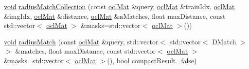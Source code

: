 \begin{DoxyCompactItemize}
\item 
\hyperlink{legacy_8hpp_a8bb47f092d473522721002c86c13b94e}{void} \hyperlink{classcv_1_1ocl_1_1BruteForceMatcher__OCL__base_a7f469948ba5afa5b039d8c1998e02ea4}{radius\-Match\-Collection} (const \hyperlink{classcv_1_1ocl_1_1oclMat}{ocl\-Mat} \&query, \hyperlink{classcv_1_1ocl_1_1oclMat}{ocl\-Mat} \&train\-Idx, \hyperlink{classcv_1_1ocl_1_1oclMat}{ocl\-Mat} \&img\-Idx, \hyperlink{classcv_1_1ocl_1_1oclMat}{ocl\-Mat} \&distance, \hyperlink{classcv_1_1ocl_1_1oclMat}{ocl\-Mat} \&n\-Matches, float max\-Distance, const std\-::vector$<$ \hyperlink{classcv_1_1ocl_1_1oclMat}{ocl\-Mat} $>$ \&masks=std\-::vector$<$ \hyperlink{classcv_1_1ocl_1_1oclMat}{ocl\-Mat} $>$())
\item 
\hyperlink{legacy_8hpp_a8bb47f092d473522721002c86c13b94e}{void} \hyperlink{classcv_1_1ocl_1_1BruteForceMatcher__OCL__base_aba5ff7d6c54310d241452f4cc96af40a}{radius\-Match} (const \hyperlink{classcv_1_1ocl_1_1oclMat}{ocl\-Mat} \&query, std\-::vector$<$ std\-::vector$<$ D\-Match $>$ $>$ \&matches, float max\-Distance, const std\-::vector$<$ \hyperlink{classcv_1_1ocl_1_1oclMat}{ocl\-Mat} $>$ \&masks=std\-::vector$<$ \hyperlink{classcv_1_1ocl_1_1oclMat}{ocl\-Mat} $>$(), bool compact\-Result=false)
\end{DoxyCompactItemize}
